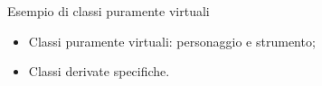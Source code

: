 \documentclass[xcolor={dvipsnames, svgnames, x11names, table}, 10pt]{beamer}
\begin{document}
\begin{frame}{Esempio di classi puramente virtuali}

\begin{itemize}
    \item Classi puramente virtuali: personaggio e strumento;
    \item Classi derivate specifiche.
\end{itemize}

\end{frame}

\Riconoscimenti
\end{document}
